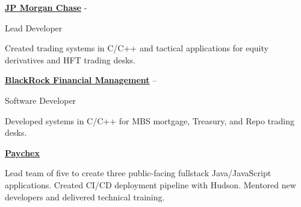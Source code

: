 \documentclass[letterpaper,MMMMyyyy,nonstopmode]{simpleresumecv}
\newif\ifLOCATION
\begin{document}
\begin{Body}
\BigGap
\Entry
\href{http://www.jpmorganchase.com/}
{\textbf{JP Morgan Chase}}
\hfill 
 - 

Lead Developer
\ifLOCATION
\hfill
New York, New York
\fi

\begin{Detail}
\Item
Created trading systems in C/C++ and tactical applications for equity derivatives and HFT trading desks.

\end{Detail}

\BigGap
\Entry
\href{http://www.blackrock.com/}
{\textbf{BlackRock Financial Management}}
\hfill 
 --  

Software Developer
\ifLOCATION
\hfill
New York, New York
\fi

\begin{Detail}
\Item
Developed systems in C/C++ for MBS mortgage, Treasury, and Repo trading desks.
\end{Detail}

\iffalse
\BigGap
\Entry
\textbf{Prophet 21, Inc.}
\hfill 
Yardley, Pennsylvania

Associate Developer
\hfill
\DatestampYM{1992}{06} --  \DatestampYM{1993}{03}

\begin{Detail}
\BulletItem
Wrote and maintained features for point-of-sale systems targeted to retailers and wholesalers

\Gap
Technologies: Sybase, ksh
\end{Detail}
\fi

\else

\BigGap
\Entry
\href{http://www.paychex.com/}
{\textbf{Paychex}}

\begin{Detail}
\BulletItem
	Lead team of five to create three public-facing fullstack Java/JavaScript applications.
	Created CI/CD deployment pipeline with Hudson.
	Mentored new developers and delivered technical training.
\end{Detail}


\end{Body}
\end{document}
